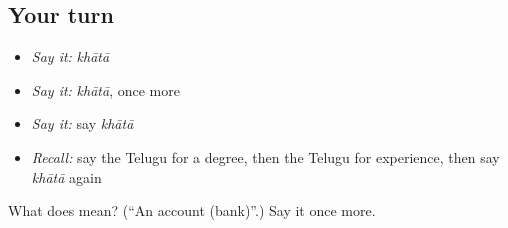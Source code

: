 \subsection*{Your turn}
\begin{itemize}
\raggedright
  \item \emph{Say it:} \emph{khātā}
  \item \emph{Say it:} \emph{khātā}, once more
  \item \emph{Say it:} say \emph{khātā}
  \item \emph{Recall:} say the Telugu for a degree, then the Telugu for experience, then say \emph{khātā} again
\end{itemize}

\begin{tcolorbox}[breakable,colback=teal!4,colframe=teal!35!black,title={Before you move on}]
What does  mean? (\textquotedblleft{}An account (bank)\textquotedblright{}.) Say it once more.
\end{tcolorbox}
